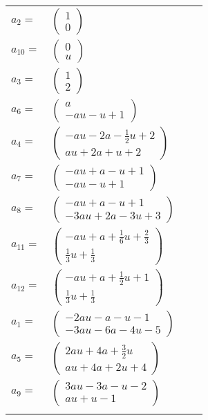 \documentclass[1p]{elsarticle_modified}
\theoremstyle{definition}
\begin{document}
\begin{tabular}{m{7pt} m{180pt} m{7pt} m{180pt} }
\flushright $a_{2}=$&$\begin{pmatrix}1\\0\end{pmatrix}$ \\
\flushright $a_{10}=$&$\begin{pmatrix}0\\u\end{pmatrix}$ \\
\flushright $a_{3}=$&$\begin{pmatrix}1\\2\end{pmatrix}$ \\
\flushright $a_{6}=$&$\begin{pmatrix}a\\- a u- u+1\end{pmatrix}$ \\
\flushright $a_{4}=$&$\begin{pmatrix}- a u-2 a-\frac{1}{2} u+2\\a u+2 a+u+2\end{pmatrix}$ \\
\flushright $a_{7}=$&$\begin{pmatrix}- a u+a- u+1\\- a u- u+1\end{pmatrix}$ \\
\flushright $a_{8}=$&$\begin{pmatrix}- a u+a- u+1\\-3 a u+2 a-3 u+3\end{pmatrix}$ \\
\flushright $a_{11}=$&$\begin{pmatrix}- a u+a+\frac{1}{6} u+\frac{2}{3}\\\frac{1}{3} u+\frac{1}{3}\end{pmatrix}$ \\
\flushright $a_{12}=$&$\begin{pmatrix}- a u+a+\frac{1}{2} u+1\\\frac{1}{3} u+\frac{1}{3}\end{pmatrix}$ \\
\flushright $a_{1}=$&$\begin{pmatrix}-2 a u- a- u-1\\-3 a u-6 a-4 u-5\end{pmatrix}$ \\
\flushright $a_{5}=$&$\begin{pmatrix}2 a u+4 a+\frac{3}{2} u\\a u+4 a+2 u+4\end{pmatrix}$ \\
\flushright $a_{9}=$&$\begin{pmatrix}3 a u-3 a- u-2\\a u+u-1\end{pmatrix}$\\&\end{tabular}
\end{document}

